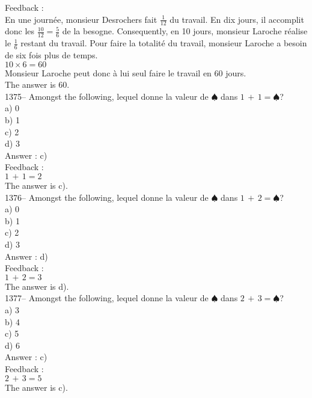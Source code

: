 \documentclass[letterpaper, 12pt]{article}
\begin{document}
Feedback : \\
En une journ\'ee, monsieur Desrochers fait $\frac{1}{12}$ du travail.  En
dix jours, il accomplit donc les $\frac{10}{12}=\frac{5}{6}$ de la besogne.
Consequently, en 10 jours, monsieur Laroche r\'ealise le $\frac{1}{6}$
restant du travail.  Pour faire la totalit\'e du travail, monsieur Laroche a
besoin de six fois plus de temps.\\
$10\times6=60$\\
Monsieur Laroche peut donc \`a lui seul faire le travail en 60 jours.  \\
The answer is 60.\\



1375-- Amongst the following, lequel donne la valeur de
$\spadesuit$ dans $1\,+\,1=\spadesuit$?\\
a) 0\\
b) 1\\
c) 2\\
d) 3\\

Answer : c)\\

Feedback : \\
$1\,+\,1=2$\\
The answer is c).\\

1376-- Amongst the following, lequel donne la valeur de
$\spadesuit$ dans $1\,+\,2=\spadesuit$?\\
a) 0\\
b) 1\\
c) 2\\
d) 3\\

Answer : d)\\

Feedback : \\
$1\,+\,2=3$\\
The answer is d).\\

1377-- Amongst the following, lequel donne la valeur de
$\spadesuit$ dans $2\,+\,3=\spadesuit$?\\
a) 3\\
b) 4\\
c) 5\\
d) 6\\

Answer : c)\\

Feedback : \\
$2\,+\,3=5$\\
The answer is c).\\
\end{document}
